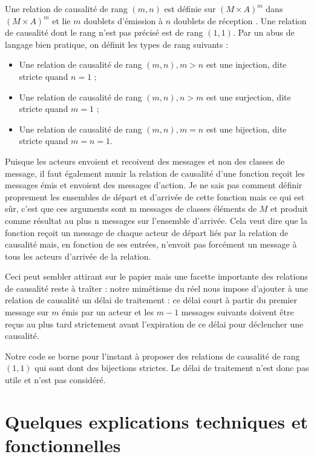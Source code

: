 \documentclass[11pt]{article}
\begin{document}
Une relation de causalité de rang $(m, n)$ est définie sur $\left(M×A\right)^m$ dans $\left(M×A\right)^m$ et lie $m$ doublets \og d'émission \fg{} à $n$ doublets \og de réception \fg{}. Une relation de causalité dont le rang n'est pas précisé est de rang $(1, 1)$. Par un abus de langage bien pratique, on définit les types de rang suivants :
\begin{itemize}
\item Une relation de causalité de rang $(m, n), m > n$ est une injection, dite stricte quand $n = 1$ ;
\item Une relation de causalité de rang $(m, n), n > m$ est une surjection, dite stricte quand $m = 1$ ;
\item Une relation de causalité de rang $(m, n), m = n$ est une bijection, dite stricte quand $m = n = 1$.
\end{itemize}

Puisque les acteurs envoient et recoivent des messages et non des classes de message, il faut également munir la relation de causalité d'une fonction reçoit les messages émis et envoient des messages d'action. Je ne sais pas comment définir proprement les ensembles de départ et d'arrivée de cette fonction mais ce qui est sûr, c'est que ces arguments sont m messages de classes éléments de $M$ et produit comme résultat au plus n messages sur l'ensemble d'arrivée. Cela veut dire que la fonction reçoit un message de chaque acteur de départ liés par la relation de causalité mais, en fonction de ses entrées, n'envoit pas forcément un message à tous les acteurs d'arrivée de la relation.

Ceci peut sembler attirant sur le papier mais une facette importante des relations de causalité reste à traîter : notre mimétisme du réel nous impose d'ajouter à une relation de causalité un délai de traitement : ce délai court à partir du premier message sur $m$ émis par un acteur et les $m - 1$ messages suivants doivent être reçus au plus tard strictement avant l'expiration de ce délai pour déclencher une causalité.

Notre code se borne pour l'instant à proposer des relations de causalité de rang $(1, 1)$ qui sont dont des bijections strictes. Le délai de traitement n'est donc pas utile et n'est pas considéré.

\section{Quelques explications techniques et fonctionnelles}
\end{document}
